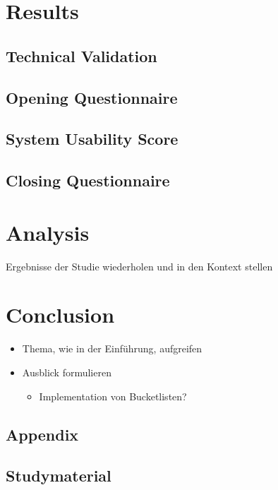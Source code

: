 \documentclass[12pt,numbers=noenddot,parskip,bibliography=totocnumbered,listof=totocnumbered]{scrreprt}
\begin{document}
\chapter{Results}

\section{Technical Validation}

\section{Opening Questionnaire}

\section{System Usability Score}

\section{Closing Questionnaire}

\chapter{Analysis}
Ergebnisse der Studie wiederholen und in den Kontext stellen

\chapter{Conclusion}
\begin{itemize} 
	\item Thema, wie in der Einführung, aufgreifen
	\item Ausblick formulieren
	\begin{itemize} 
		\item Implementation von Bucketlisten?
	\end{itemize} 
\end{itemize} 


\begin{appendix} 
\chapter{Appendix}
\newpage
\section{Studymaterial}
\vspace*{\fill}
\label{lab:Studymaterial}
\vspace*{\fill}
\end{appendix}
\end{document}
